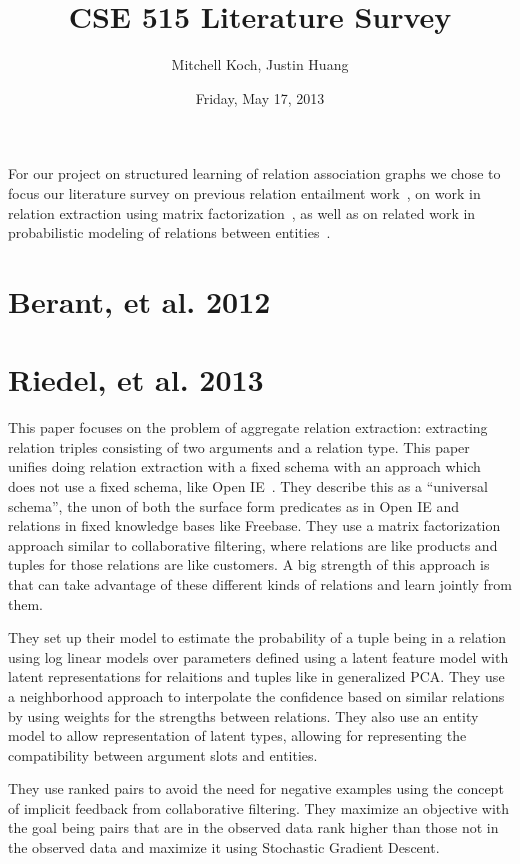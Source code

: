 \documentclass{article}
\author{Mitchell Koch, Justin Huang}
\title{CSE 515 Literature Survey}
\date{Friday, May 17, 2013}
\begin{document}
\maketitle

For our project on structured learning of relation association graphs we chose to focus our literature survey on previous relation entailment work~\cite{Berant:2012:LER:2122944.2122947}, on work in relation extraction using matrix factorization~\cite{riedel13relation}, as well as on related work in probabilistic modeling of relations between entities~\cite{TaskarWAK03}.

\section*{Berant, et al. 2012}

\section*{Riedel, et al. 2013}

This paper focuses on the problem of aggregate relation extraction: extracting relation triples consisting of two arguments and a relation type. This paper unifies doing relation extraction with a fixed schema with an approach which does not use a fixed schema, like Open IE~\cite{Etzioni:2008:OIE:1409360.1409378}. They describe this as a ``universal schema'', the unon of both the surface form predicates as in Open IE and relations in fixed knowledge bases like Freebase. They use a matrix factorization approach similar to collaborative filtering, where relations are like products and tuples for those relations are like customers. A big strength of this approach is that can take advantage of these different kinds of relations and learn jointly from them.

They set up their model to estimate the probability of a tuple being in a relation using log linear models over parameters defined using a latent feature model with latent representations for relaitions and tuples like in generalized PCA. They use a neighborhood approach to interpolate the confidence based on similar relations by using weights for the strengths between relations. They also use an entity model to allow representation of latent types, allowing for representing the compatibility between argument slots and entities.

They use ranked pairs to avoid the need for negative examples using the concept of implicit feedback from collaborative filtering. They maximize an objective with the goal being pairs that are in the observed data rank higher than those not in the observed data and maximize it using Stochastic Gradient Descent.
\end{document}

